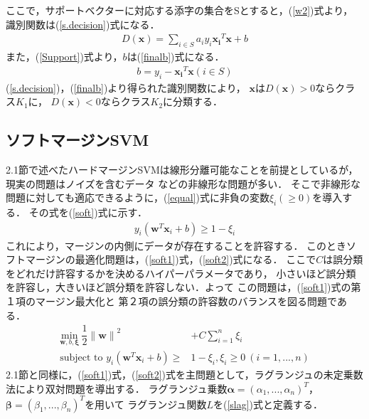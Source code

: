 ここで，サポートベクターに対応する添字の集合をSとすると，(\ref{w2})式より，
識別関数は(\ref{s.decision})式になる．
\begin{align}
    \label{s.decision}
    D(\boldsymbol{x}) = \sum_{i\in S}a_iy_i\boldsymbol{x_i}^T\boldsymbol{x} + b
\end{align}
また，(\ref{Support})式より，$b$は(\ref{finalb})式になる．
\begin{align}
  \label{finalb}
  b =y_i - \boldsymbol{x_i}^T\boldsymbol{x}(i \in S)
\end{align}
(\ref{s.decision})，(\ref{finalb})より得られた識別関数により，
$\boldsymbol{x}$は$D(\boldsymbol{x}) > 0$ならクラス$K_1$に，
$D(\boldsymbol{x}) < 0$ならクラス$K_2$に分類する．

\subsection{ソフトマージンSVM}
2.1節で述べたハードマージンSVMは線形分離可能なことを前提としているが，現実の問題はノイズを含むデータ
などの非線形な問題が多い．
そこで非線形な問題に対しても適応できるように，(\ref{equal})式に非負の変数$\xi_i(\geq 0)$を導入する．
その式を(\ref{soft})式に示す．
\begin{align}
    \label{soft}
    y_i(\boldsymbol{w}^T \boldsymbol{x}_i + b) \geq 1 - \xi_i
\end{align}
これにより，マージンの内側にデータが存在することを許容する．
このときソフトマージンの最適化問題は，(\ref{soft1})式，(\ref{soft2})式になる．
ここで$C$は誤分類をどれだけ許容するかを決めるハイパーパラメータであり，
小さいほど誤分類を許容し，大きいほど誤分類を許容しない．よって
この問題は，(\ref{soft1})式の第１項のマージン最大化と
第２項の誤分類の許容数のバランスを図る問題である．
\begin{subequations}
\begin{align}
    \underset{\boldsymbol{w},b,\boldsymbol{\xi}}{\text{min}}~\dfrac{1}{2}{\|\boldsymbol{{w}}\|}^2
    &+C\sum_{i=1}^{n}\xi_i \label{soft1}\\
   \text{subject to } y_i(\boldsymbol{w}^T \boldsymbol{x}_i + b) \geq &1 - \xi_i,\xi_i \geq 0 ~(i=1,...,n)\label{soft2}
\end{align}
\end{subequations}
2.1節と同様に，(\ref{soft1})式，(\ref{soft2})式を主問題として，ラグランジュの未定乗数法により双対問題を導出する．
ラグランジュ乗数$\boldsymbol{\alpha} = (\alpha_1,...,\alpha_n)^T$，
$\boldsymbol{\beta} = (\beta_1,...,\beta_n)^T$を用いて
ラグランジュ関数$L$を(\ref{slag})式と定義する．
